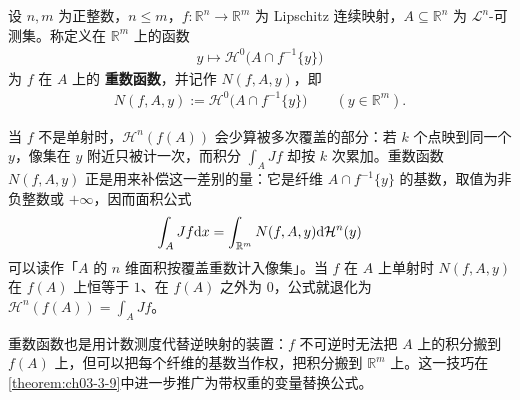 \documentclass[../../main.tex]{subfiles}%
\begin{document}
\begin{definition}[重数函数]\label{definition:ch03-3-7}
设 $n,m$ 为正整数，$n\leqslant m$，$f:\mathbb{R}^n\to\mathbb{R}^m$ 为 Lipschitz 连续映射，$A\subseteq\mathbb{R}^n$ 为 $\mathcal{L}^n$-可测集。称定义在 $\mathbb{R}^m$ 上的函数
\begin{align*}
y\mapsto\mathcal{H}^0\bigl(A\cap f^{-1}\{y\}\bigr)
\end{align*}
为 $f$ 在 $A$ 上的 \textbf{重数函数}，并记作 $N(f,A,y)$，即
\begin{align*}
N(f,A,y):=\mathcal{H}^0\bigl(A\cap f^{-1}\{y\}\bigr)\qquad(y\in\mathbb{R}^m).
\end{align*}
\end{definition}

\begin{remark}\label{remark:ch03-def-3-7-动机}
当 $f$ 不是单射时，$\mathcal{H}^n(f(A))$ 会少算被多次覆盖的部分：若 $k$ 个点映到同一个 $y$，像集在 $y$ 附近只被计一次，而积分 $\int_AJf$ 却按 $k$ 次累加。重数函数 $N(f,A,y)$ 正是用来补偿这一差别的量：它是纤维 $A\cap f^{-1}\{y\}$ 的基数，取值为非负整数或 $+\infty$，因而面积公式
\begin{align*}
\int_AJf\mathrm{d} x=\int_{\mathbb{R}^m}N(f,A,y)\mathrm{d}\mathcal{H}^n(y)
\end{align*}
可以读作「$A$ 的 $n$ 维面积按覆盖重数计入像集」。当 $f$ 在 $A$ 上单射时 $N(f,A,y)$ 在 $f(A)$ 上恒等于 $1$、在 $f(A)$ 之外为 $0$，公式就退化为 $\mathcal{H}^n(f(A))=\int_AJf$。

重数函数也是用计数测度代替逆映射的装置：$f$ 不可逆时无法把 $A$ 上的积分搬到 $f(A)$ 上，但可以把每个纤维的基数当作权，把积分搬到 $\mathbb{R}^m$ 上。这一技巧在\cref{theorem:ch03-3-9}中进一步推广为带权重的变量替换公式。%
\end{remark}
\end{document}
